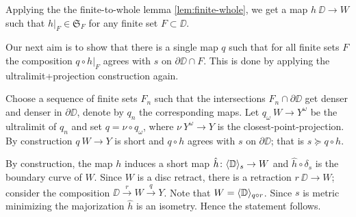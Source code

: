 Applying the the finite-to-whole lemma \ref{lem:finite-whole},
we get a map $h\:\DD\to W$ such that $h|_F\in \mathfrak{S}_F$
for any finite set $F\subset \DD$.

Our next aim is to show that there is a single map $q$ such that
for all finite sets $F$ the composition $q\circ h|_F$ agrees with
$s$ on $\partial\DD\cap F$.
This is done by applying the ultralimit+projection construction again.

Choose a sequence of finite sets $F_n$ such that the intersections $F_n\cap\partial \DD$ get denser and denser in $\partial \DD$, 
denote by $q_n$ the corresponding maps.
Let $q_\omega\:W\to Y^\omega$ be the ultralimit of $q_n$ and set $q=\nu\circ q_\omega$,
where $\nu\:Y^\omega\to Y$ is the closest-point-projection.
By construction $q\:W\to Y$ is short and $q\circ h$ agrees with $s$ on $\partial \DD$;
that is $s\succcurlyeq q\circ h$.

By construction, the map $h$ induces a short map $\hat h\colon\langle\mathbb{D}\rangle_s\to W$ and $\hat h\circ\delta_s$ is the boundary curve of $W$.
Since $W$ is a disc retract, there is a retraction $r\:\DD\to W$;
consider the composition $\DD\xrightarrow{r}W\xrightarrow{q} Y$.
Note that  $W=\langle\mathbb{D}\rangle_{q\circ r}$.
Since $s$ is metric minimizing the majorization $\hat h$ is an isometry.
Hence the statement follows.
\qeds